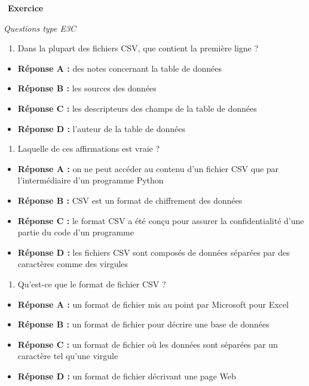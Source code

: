 \documentclass[
  11pt,
]{article}
\providecommand{\tightlist}{%
  \setlength{\itemsep}{0pt}\setlength{\parskip}{0pt}}
\newcounter{exo}
\newenvironment{exercice}[1]
{\par \medskip   \addtocounter{exo}{1} \noindent  
\begin{bclogo}[arrondi =0.1,   noborder = true, logo=\bccrayon, marge=4]{~\textbf{Exercice} \textbf{\theexo} {\itshape #1} }  \par}
{
\end{bclogo}
 \par \bigskip }
\newcounter{def}
\newcounter{prog}
\begin{document}
\begin{exercice}{}

\emph{Questions type E3C}

\begin{enumerate}
\def\labelenumi{\arabic{enumi}.}
\tightlist
\item
  Dans la plupart des fichiers CSV, que contient la première ligne ?
\end{enumerate}

\begin{itemize}
\tightlist
\item
  \textbf{Réponse A :} des notes concernant la table de données
\item
  \textbf{Réponse B :} les sources des données
\item
  \textbf{Réponse C :} les descripteurs des champs de la table de
  données
\item
  \textbf{Réponse D :} l'auteur de la table de données
\end{itemize}

\begin{enumerate}
\def\labelenumi{\arabic{enumi}.}
\setcounter{enumi}{1}
\tightlist
\item
  Laquelle de ces affirmations est vraie ?
\end{enumerate}

\begin{itemize}
\tightlist
\item
  \textbf{Réponse A :} on ne peut accéder au contenu d'un fichier CSV
  que par l'intermédiaire d'un programme Python
\item
  \textbf{Réponse B :} CSV est un format de chiffrement des données
\item
  \textbf{Réponse C :} le format CSV a été conçu pour assurer la
  confidentialité d'une partie du code d'un programme
\item
  \textbf{Réponse D :} les fichiers CSV sont composés de données
  séparées par des caractères comme des virgules
\end{itemize}

\begin{enumerate}
\def\labelenumi{\arabic{enumi}.}
\setcounter{enumi}{2}
\tightlist
\item
  Qu'est-ce que le format de fichier CSV ?
\end{enumerate}

\begin{itemize}
\tightlist
\item
  \textbf{Réponse A :} un format de fichier mis au point par Microsoft
  pour Excel
\item
  \textbf{Réponse B :} un format de fichier pour décrire une base de
  données
\item
  \textbf{Réponse C :} un format de fichier où les données sont séparées
  par un caractère tel qu'une virgule
\item
  \textbf{Réponse D :} un format de fichier décrivant une page Web
\end{itemize}

\end{exercice}
\end{document}
